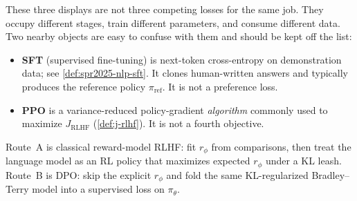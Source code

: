 \documentclass[11pt,a4paper]{article}
\theoremstyle{definition}
\begin{document}
\begin{remark}\label{rem:rlhf-overview}
These three displays are not three competing losses for the same job. They occupy
different stages, train different parameters, and consume different data. Two nearby
objects are easy to confuse with them and should be kept off the list:
\begin{itemize}
    \item \textbf{SFT} (supervised fine-tuning) is next-token cross-entropy on
    demonstration data; see \cref{def:spr2025-nlp-sft}. It clones human-written
    answers and typically produces the reference policy $\pi_{\mathrm{ref}}$. It is
    not a preference loss.
    \item \textbf{PPO} is a variance-reduced policy-gradient \emph{algorithm} commonly
    used to maximize $J_{\mathrm{RLHF}}$ (\cref{def:j-rlhf}). It is not a fourth objective.
\end{itemize}

Route~A is classical reward-model RLHF: fit $r_\phi$ from comparisons, then treat the
language model as an RL policy that maximizes expected $r_\phi$ under a KL leash.
Route~B is DPO: skip the explicit $r_\phi$ and fold the same KL-regularized Bradley--Terry
model into a supervised loss on $\pi_\theta$.

\begin{center}
\end{center}


\end{remark}
\end{document}
